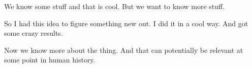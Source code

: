 We know some stuff and that is cool.
But we want to know more stuff.

So I had this idea to figure something new out.
I did it in a cool way.
And got some crazy results.

Now we know more about the thing.
And that can potentially be relevant at some point in human history.
